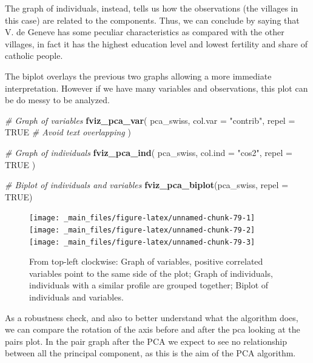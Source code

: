 \documentclass[
]{svmono}
\newenvironment{Shaded}{\begin{snugshade}}{\end{snugshade}}
\newcommand{\AttributeTok}[1]{\textcolor[rgb]{0.13,0.29,0.53}{#1}}
\newcommand{\CommentTok}[1]{\textcolor[rgb]{0.56,0.35,0.01}{\textit{#1}}}
\newcommand{\ConstantTok}[1]{\textcolor[rgb]{0.56,0.35,0.01}{#1}}
\newcommand{\FunctionTok}[1]{\textcolor[rgb]{0.13,0.29,0.53}{\textbf{#1}}}
\newcommand{\NormalTok}[1]{#1}
\newcommand{\StringTok}[1]{\textcolor[rgb]{0.31,0.60,0.02}{#1}}
\begin{document}
The graph of individuals, instead, tells us how the observations (the
villages in this case) are related to the components. Thus, we can
conclude by saying that V. de Geneve has some peculiar characteristics
as compared with the other villages, in fact it has the highest
education level and lowest fertility and share of catholic people.

The biplot overlays the previous two graphs allowing a more immediate
interpretation. However if we have many variables and observations, this
plot can be do messy to be analyzed.

\begin{Shaded}
\begin{Highlighting}[]
\CommentTok{\# Graph of variables}
\FunctionTok{fviz\_pca\_var}\NormalTok{(}
\NormalTok{        pca\_swiss,}
        \AttributeTok{col.var =} \StringTok{"contrib"}\NormalTok{,}
        \AttributeTok{repel =} \ConstantTok{TRUE}     \CommentTok{\# Avoid text overlapping}
\NormalTok{)}

\CommentTok{\# Graph of individuals}
\FunctionTok{fviz\_pca\_ind}\NormalTok{(}
\NormalTok{        pca\_swiss,}
        \AttributeTok{col.ind =} \StringTok{"cos2"}\NormalTok{,}
        \AttributeTok{repel =} \ConstantTok{TRUE}
\NormalTok{)}

\CommentTok{\# Biplot of individuals and variables}
\FunctionTok{fviz\_pca\_biplot}\NormalTok{(pca\_swiss, }\AttributeTok{repel =} \ConstantTok{TRUE}\NormalTok{)}
\end{Highlighting}
\end{Shaded}

\begin{figure}[H]
\texttt{[image: \_main\_files/figure-latex/unnamed-chunk-79-1]} \texttt{[image: \_main\_files/figure-latex/unnamed-chunk-79-2]} \texttt{[image: \_main\_files/figure-latex/unnamed-chunk-79-3]} \caption{From top-left clockwise: Graph of variables, positive correlated variables point to the same side of the plot; Graph of individuals, individuals with a similar profile are grouped together; Biplot of individuals and variables.}\label{fig:unnamed-chunk-79}
\end{figure}

As a robustness check, and also to better understand what the algorithm
does, we can compare the rotation of the axis before and after the pca
looking at the pairs plot. In the pair graph after the PCA we expect to
see no relationship between all the principal component, as this is the
aim of the PCA algorithm.
\end{document}
